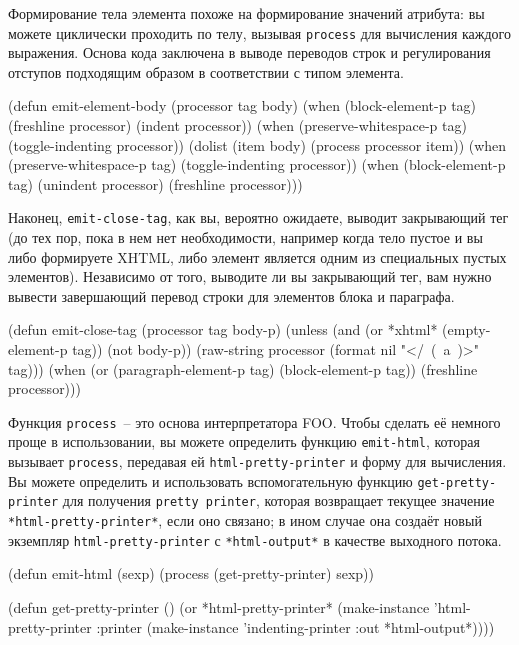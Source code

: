 Формирование тела элемента похоже на формирование значений атрибута: вы можете циклически
проходить по телу, вызывая \lstinline{process} для вычисления каждого выражения. Основа кода
заключена в выводе переводов строк и регулирования отступов подходящим образом в
соответствии с типом элемента.

\begin{myverb}
(defun emit-element-body (processor tag body)
  (when (block-element-p tag)
    (freshline processor)
    (indent processor))
  (when (preserve-whitespace-p tag) (toggle-indenting processor))
  (dolist (item body)  (process processor item))
  (when (preserve-whitespace-p tag) (toggle-indenting processor))
  (when (block-element-p tag)
    (unindent processor)
    (freshline processor)))
\end{myverb}

Наконец, \lstinline{emit-close-tag}, как вы, вероятно ожидаете, выводит закрывающий тег (до тех
пор, пока в нем нет необходимости, например когда тело пустое и вы либо формируете XHTML,
либо элемент является одним из специальных пустых элементов). Независимо от того, выводите
ли вы закрывающий тег, вам нужно вывести завершающий перевод строки для элементов блока и
параграфа.

\begin{myverb}
(defun emit-close-tag (processor tag body-p)
  (unless (and (or *xhtml* (empty-element-p tag)) (not body-p))
    (raw-string processor (format nil "</~(~a~)>" tag)))
  (when (or (paragraph-element-p tag) (block-element-p tag))
    (freshline processor)))
\end{myverb}

Функция \lstinline{process}~-- это основа интерпретатора FOO. Чтобы сделать её немного проще в
использовании, вы можете определить функцию \lstinline{emit-html}, которая вызывает
\lstinline{process}, передавая ей \lstinline{html-pretty-printer} и форму для вычисления. Вы можете
определить и использовать вспомогательную функцию \lstinline{get-pretty-printer} для получения
\lstinline{pretty printer}, которая возвращает текущее значение \lstinline{*html-pretty-printer*},
если оно связано; в ином случае она создаёт новый экземпляр \lstinline{html-pretty-printer} с
\lstinline{*html-output*} в качестве выходного потока.

\begin{myverb}
(defun emit-html (sexp) (process (get-pretty-printer) sexp))

(defun get-pretty-printer ()
  (or *html-pretty-printer*
      (make-instance 
       'html-pretty-printer
       :printer (make-instance 'indenting-printer :out *html-output*))))
\end{myverb}

